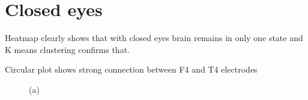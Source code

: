 \vspace*{2cm}


\section{Closed eyes}

\par Heatmap clearly shows that with closed eyes brain remains in only one state and K means clustering confirms that.
\par Circular plot shows strong connection between F4 and T4 electrodes

\begin{figure}[h!]
\begin{minipage}[h]{0.49\linewidth}
 (a) \\
\end{minipage}
\hfill
\begin{minipage}[h]{0.5\linewidth}

\end{minipage}
\end{figure}
